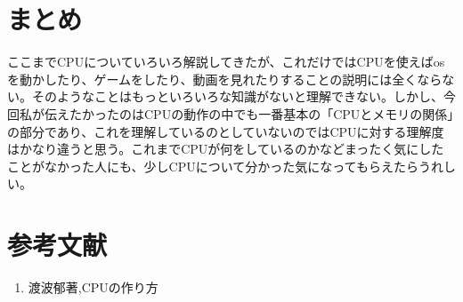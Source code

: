 \section{まとめ}
ここまでCPUについていろいろ解説してきたが、これだけではCPUを使えばosを動かしたり、ゲームをしたり、動画を見れたりすることの説明には全くならない。そのようなことはもっといろいろな知識がないと理解できない。しかし、今回私が伝えたかったのはCPUの動作の中でも一番基本の「CPUとメモリの関係」の部分であり、これを理解しているのとしていないのではCPUに対する理解度はかなり違うと思う。これまでCPUが何をしているのかなどまったく気にしたことがなかった人にも、少しCPUについて分かった気になってもらえたらうれしい。\\


\section*{参考文献}
\begin{enumerate}
  \item 渡波郁著,CPUの作り方
\end{enumerate}

